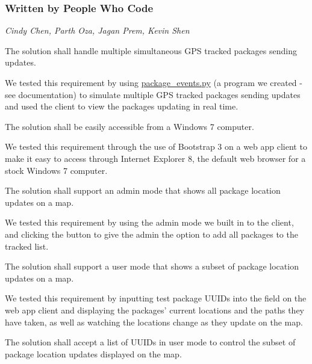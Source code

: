 \subsubsection*{Written by People Who Code}

{\itshape  Cindy Chen, Parth Oza, Jagan Prem, Kevin Shen }


\begin{DoxyEnumerate}
\item The solution shall handle multiple simultaneous G\+PS tracked packages sending updates.
\begin{DoxyItemize}
\item We tested this requirement by using {\ttfamily \hyperlink{package__events_8py}{package\+\_\+events.\+py}} (a program we created -\/ see documentation) to simulate multiple G\+PS tracked packages sending updates and used the client to view the packages updating in real time.
\end{DoxyItemize}
\item The solution shall be easily accessible from a Windows 7 computer.
\begin{DoxyItemize}
\item We tested this requirement through the use of Bootstrap 3 on a web app client to make it easy to access through Internet Explorer 8, the default web browser for a stock Windows 7 computer.
\end{DoxyItemize}
\item The solution shall support an admin mode that shows all package location updates on a map.
\begin{DoxyItemize}
\item We tested this requirement by using the admin mode we built in to the client, and clicking the button to give the admin the option to add all packages to the tracked list.
\end{DoxyItemize}
\item The solution shall support a user mode that shows a subset of package location updates on a map.
\begin{DoxyItemize}
\item We tested this requirement by inputting test package U\+U\+I\+Ds into the field on the web app client and displaying the packages’ current locations and the paths they have taken, as well as watching the locations change as they update on the map.
\end{DoxyItemize}
\item The solution shall accept a list of U\+U\+I\+Ds in user mode to control the subset of package location updates displayed on the map.

\end{DoxyEnumerate}
